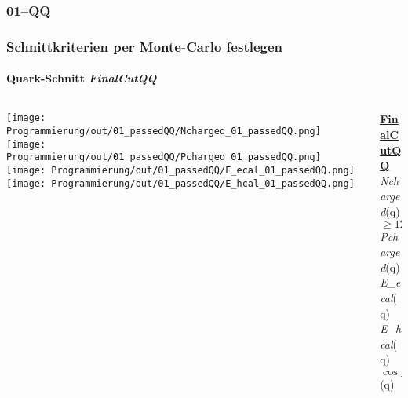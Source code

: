 \documentclass{beamer}
\begin{document}
\subsubsection{01--QQ}
\begin{frame}
	\frametitle{Schnittkriterien per Monte-Carlo festlegen}
	\framesubtitle{Quark-Schnitt \textit{FinalCutQQ}}
	\begin{columns}
		\begin{column}{0.95\textwidth}
			\texttt{[image: Programmierung/out/01\_passedQQ/Ncharged\_01\_passedQQ.png]}
			\texttt{[image: Programmierung/out/01\_passedQQ/Pcharged\_01\_passedQQ.png]}
			\newline
			\texttt{[image: Programmierung/out/01\_passedQQ/E\_ecal\_01\_passedQQ.png]}
			\texttt{[image: Programmierung/out/01\_passedQQ/E\_hcal\_01\_passedQQ.png]}
		\end{column}
		\begin{column}{0.2\textwidth}
			\uline{\textbf{FinalCutQQ}}\\
			{\color{blue}\textit{Ncharged}(q)}\newline
					$\geq 12$\\
			{\color{blue}\textit{Pcharged}(q)}\newline
					\\
			{\color[rgb]{0.6,0.6,0}\textit{E\_ecal}(q)}\newline
					\\
			{\color[rgb]{1,0,1}\textit{E\_hcal}(q)}\newline
					\\
			$\cos\_thet$(q)\newline
								\\
			\\
			\\
			\\
			\\
		\end{column}
	\end{columns}
\end{frame}
\end{document}
